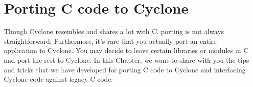 \section{Porting C code to Cyclone}

\ifscreen
\newenvironment{porta}[2]{%
  \begin{list}{}{}%
  \item[\hypertarget{#1}{\colorbox{lightblue}{\textbf{#2}}}]}{\end{list}}
\else
\newenvironment{porta}[2]{%
  \begin{list}{}{}%
  \item[\hypertarget{#1}{\textbf{#2}}]}{\end{list}}
\fi
Though Cyclone resembles and shares a lot with C, porting is not
always straightforward.  Furthermore, it's rare that you actually port
an entire application to Cyclone.  You may decide to leave certain
libraries or modules in C and port the rest to Cyclone.  In this
Chapter, we want to share with you the tips and tricks that we have
developed for porting C code to Cyclone and interfacing Cyclone
code against legacy C code.

